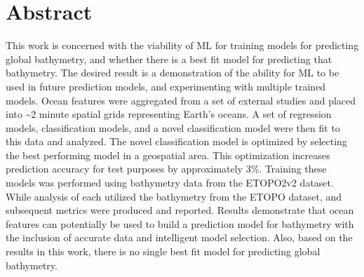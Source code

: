 \section{Abstract}
\setlength{\parindent}{10ex}
This work is concerned with the viability of \ac{ML} for training models  for predicting global bathymetry, and whether there is a best fit model for predicting that bathymetry.
The desired result is a demonstration of the ability for \ac{ML} to be used in future prediction models, and experimenting with multiple trained models.
Ocean features were aggregated from a set of external studies and placed into \~{}2 minute spatial grids representing Earth's oceans.
A set of regression models, classification models, and a novel classification model were then fit to this data and analyzed.
The novel classification model is optimized by selecting the best performing model in a geospatial area.
This optimization increases prediction accuracy for test purposes by approximately 3\%.
Training these models was performed using bathymetry data from the ETOPO2v2 dataset.
While analysis of each utilized the bathymetry from the ETOPO dataset, and subsequent metrics were produced and reported.
Results demonstrate that ocean features can potentially be used to build a prediction model for bathymetry with the inclusion of accurate data and intelligent model selection.
Also, based on the results in this work, there is no single best fit model for predicting global bathymetry.
